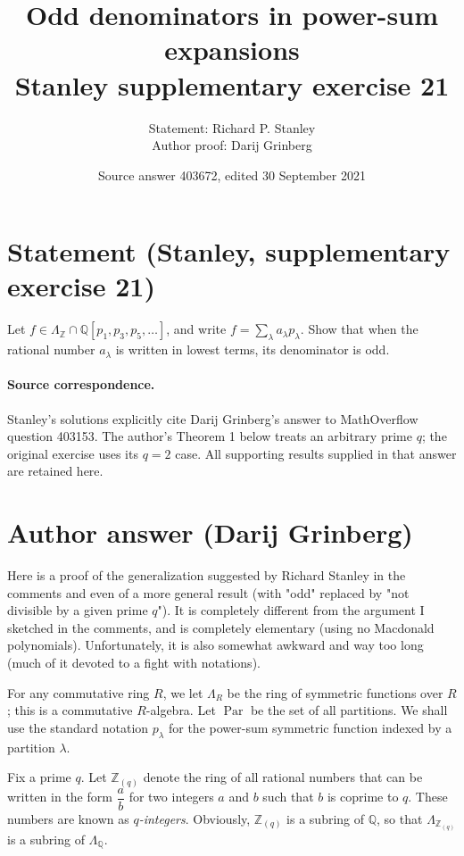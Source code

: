 \documentclass[10pt,a4paper]{article}
\title{Odd denominators in power-sum expansions\\Stanley supplementary exercise 21}
\author{Statement: Richard P. Stanley\\Author proof: Darij Grinberg}
\date{Source answer 403672, edited 30 September 2021}
\begin{document}
\maketitle
\section*{Statement (Stanley, supplementary exercise 21)}
Let \(f\in\Lambda_{\mathbb Z}\cap\mathbb Q[p_1,p_3,p_5,\ldots]\), and write
\(f=\sum_\lambda a_\lambda p_\lambda\).
Show that when the rational number \(a_\lambda\) is written in lowest terms,
its denominator is odd.

\paragraph{Source correspondence.}
Stanley's solutions explicitly cite Darij Grinberg's answer to MathOverflow question 403153.
The author's Theorem 1 below treats an arbitrary prime \(q\);
the original exercise uses its \(q=2\) case.
All supporting results supplied in that answer are retained here.

\section*{Author answer (Darij Grinberg)}


Here is a proof of the generalization suggested by Richard Stanley in the
comments and even of a more general result (with "odd" replaced by "not
divisible by a given prime $q$"). It is completely different from the argument
I sketched in the comments, and is completely elementary (using no Macdonald
polynomials). Unfortunately, it is also somewhat awkward and way too long
(much of it devoted to a fight with notations).




For any commutative ring $R$, we let $\Lambda_{R}$ be the ring of symmetric
functions over $R$; this is a commutative $R$-algebra. Let
$\operatorname{Par}$ be the set of all partitions. We shall use the standard
notation $p_{\lambda}$ for the power-sum symmetric function indexed by a
partition $\lambda$.




Fix a prime $q$. Let $\mathbb{Z}_{\left(  q\right)  }$ denote the ring of all
rational numbers that can be written in the form $\dfrac{a}{b}$ for two
integers $a$ and $b$ such that $b$ is coprime to $q$. These numbers are known
as \emph{$q$-integers}. Obviously, $\mathbb{Z}_{\left(  q\right)  }$ is a subring
of $\mathbb{Q}$, so that $\Lambda_{\mathbb{Z}_{\left(  q\right)  }}$ is a
subring of $\Lambda_{\mathbb{Q}}$.
\end{document}
